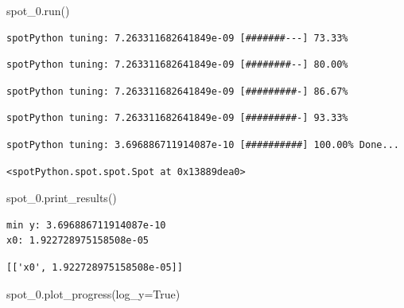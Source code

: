 \documentclass[
  letterpaper,
  DIV=11,
  numbers=noendperiod]{scrreprt}
\newenvironment{Shaded}{\begin{snugshade}}{\end{snugshade}}
\newcommand{\NormalTok}[1]{\textcolor[rgb]{0.00,0.23,0.31}{#1}}
\newcommand{\OperatorTok}[1]{\textcolor[rgb]{0.37,0.37,0.37}{#1}}
\newcommand{\VariableTok}[1]{\textcolor[rgb]{0.07,0.07,0.07}{#1}}
\begin{document}
\begin{Shaded}
\begin{Highlighting}[]
\NormalTok{spot\_0.run()}
\end{Highlighting}
\end{Shaded}

\begin{verbatim}
spotPython tuning: 7.263311682641849e-09 [#######---] 73.33% 
\end{verbatim}

\begin{verbatim}
spotPython tuning: 7.263311682641849e-09 [########--] 80.00% 
\end{verbatim}

\begin{verbatim}
spotPython tuning: 7.263311682641849e-09 [#########-] 86.67% 
\end{verbatim}

\begin{verbatim}
spotPython tuning: 7.263311682641849e-09 [#########-] 93.33% 
\end{verbatim}

\begin{verbatim}
spotPython tuning: 3.696886711914087e-10 [##########] 100.00% Done...
\end{verbatim}

\begin{verbatim}
<spotPython.spot.spot.Spot at 0x13889dea0>
\end{verbatim}

\begin{Shaded}
\begin{Highlighting}[]
\NormalTok{spot\_0.print\_results()}
\end{Highlighting}
\end{Shaded}

\begin{verbatim}
min y: 3.696886711914087e-10
x0: 1.922728975158508e-05
\end{verbatim}

\begin{verbatim}
[['x0', 1.922728975158508e-05]]
\end{verbatim}

\begin{Shaded}
\begin{Highlighting}[]
\NormalTok{spot\_0.plot\_progress(log\_y}\OperatorTok{=}\VariableTok{True}\NormalTok{)}
\end{Highlighting}
\end{Shaded}
\end{document}
